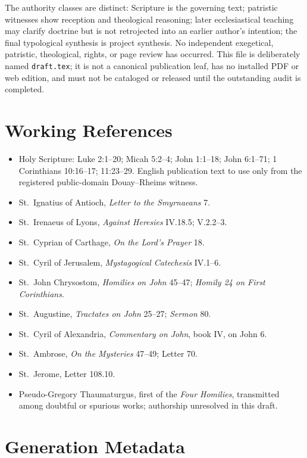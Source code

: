 \begin{deepstudy}
The authority classes are distinct: Scripture is the governing text;
patristic witnesses show reception and theological reasoning; later
ecclesiastical teaching may clarify doctrine but is not retrojected into an
earlier author's intention; the final typological synthesis is project
synthesis. No independent exegetical, patristic, theological, rights, or page
review has occurred. This file is deliberately named \texttt{draft.tex}; it is
not a canonical publication leaf, has no installed PDF or web edition, and must
not be cataloged or released until the outstanding audit is completed.

\section{Working References}
\begin{itemize}
\item Holy Scripture: Luke 2:1--20; Micah 5:2--4; John 1:1--18; John 6:1--71;
1 Corinthians 10:16--17; 11:23--29. English publication text to use only from
the registered public-domain Douay--Rheims witness.
\item St.\ Ignatius of Antioch, \emph{Letter to the Smyrnaeans} 7.
\item St.\ Irenaeus of Lyons, \emph{Against Heresies} IV.18.5; V.2.2--3.
\item St.\ Cyprian of Carthage, \emph{On the Lord's Prayer} 18.
\item St.\ Cyril of Jerusalem, \emph{Mystagogical Catechesis} IV.1--6.
\item St.\ John Chrysostom, \emph{Homilies on John} 45--47; \emph{Homily 24 on
First Corinthians}.
\item St.\ Augustine, \emph{Tractates on John} 25--27; \emph{Sermon} 80.
\item St.\ Cyril of Alexandria, \emph{Commentary on John}, book IV, on John 6.
\item St.\ Ambrose, \emph{On the Mysteries} 47--49; Letter 70.
\item St.\ Jerome, Letter 108.10.
\item Pseudo-Gregory Thaumaturgus, first of the \emph{Four Homilies}, transmitted
among doubtful or spurious works; authorship unresolved in this draft.
\end{itemize}

\section{Generation Metadata}

\end{deepstudy}

